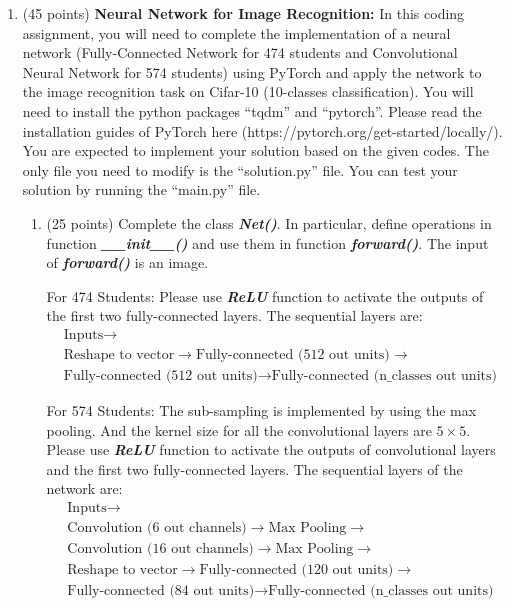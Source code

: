 \documentclass[11pt]{article}
\begin{document}
\begin{enumerate}
    \item (45 points) \textbf{Neural Network for Image
    Recognition:} In this coding assignment, you will need to
    complete the implementation of a neural network
    (Fully-Connected Network for 474 students and Convolutional
    Neural Network for 574 students) using PyTorch and apply the
    network to the image recognition task on Cifar-10 (10-classes
    classification). You will need to install the python packages
    ``tqdm'' and ``pytorch''. Please read the installation guides
    of PyTorch here (https://pytorch.org/get-started/locally/).
    You are expected to implement your solution based on the
    given codes. The only file you need to modify is the
    ``solution.py'' file. You can test your solution by running
    the ``main.py'' file.
    
    \begin{enumerate}
    \item (25 points) Complete the class \emph{\textbf{Net()}}.
    In particular, define operations in function
    \emph{\textbf{\_\_init\_\_()}} and use them in function
    \emph{\textbf{forward()}}. The input of
    \emph{\textbf{forward()}} is an image.
    
    {\color{red} For 474 Students:} Please use
    \emph{\textbf{ReLU}} function to activate the outputs of the
    first two fully-connected layers. The sequential layers are:
    \begin{align*}
    &\text{Inputs} \to \\
    &\text{Reshape to vector}\to \text{Fully-connected (512 out units)}\to \\
    &\text{Fully-connected (512 out units)}\to \text{Fully-connected (n\_classes out units)}
    \end{align*}

    {\color{red} For 574 Students:}
    The sub-sampling is implemented by using the max pooling. And
    the kernel size for all the convolutional layers are $5\times
    5$. Please use \emph{\textbf{ReLU}} function to activate the
    outputs of convolutional layers and the first two
    fully-connected layers. The sequential layers of the network are:
    \begin{align*}
    &\text{Inputs} \to \\
    &\text{Convolution (6 out channels)} \to \text{Max Pooling} \to \\
    &\text{Convolution (16 out channels)}\to \text{Max Pooling}\to\\
    &\text{Reshape to vector}\to \text{Fully-connected (120 out units)}\to \\
    &\text{Fully-connected (84 out units)}\to \text{Fully-connected (n\_classes out units)}
    \end{align*}
    

\end{enumerate}
\end{enumerate}
\end{document}
